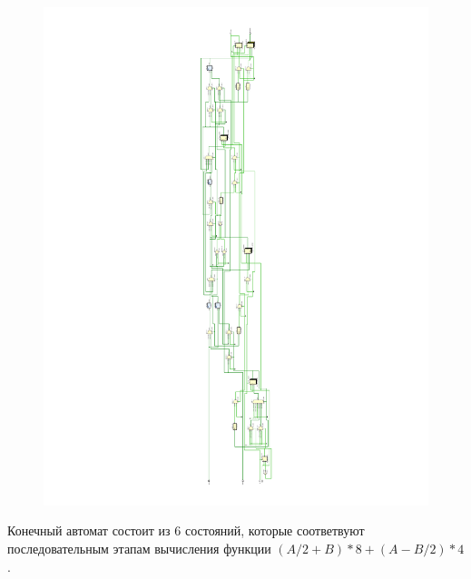 \documentclass[12pt,onecolumn]{article}
\begin{document}
\begin{figure}[H]
    \includegraphics[]{image/fsm-schema.pdf}
\end{figure}

Конечный автомат состоит из 6 состояний, которые соответвуют последовательным этапам вычисления функции $(A/2+B)*8 + (A-B/2)*4$.
\end{document}
